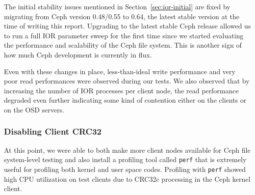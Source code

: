 The initial stability issues mentioned in Section~\ref{sec:ior-initial} are
fixed by migrating from Ceph version 0.48/0.55 to 0.64, the latest stable
version at the time of writing this report.  Upgrading to the latest stable
Ceph release allowed us to run a full IOR parameter sweep for the first time
since we started evaluating the performance and scalability of the Ceph file
system.  This is another sign of how much Ceph development is currently in
flux.


\begin{comment}

Another fix introduced by Ceph version 0.64 was in pool creation.  The default
data pool used by previous Ceph version were set to 2x replication by mistake.
This potentially halved the write performance. With version 0.64 we explicitly
set the replication level to 1, which is the preferred value for a HPC
environment like ours running on high-end and reliable storage backend hardware
(e.g. DDN SFA10K).

\end{comment}


Even with these changes in place, less-than-ideal write performance and very
poor read performances were observed during our tests.  We also observed that
by increasing the number of IOR processes per client node, the read
performance degraded even further indicating some kind of contention either on
the clients or on the OSD servers.


\subsubsection{Disabling Client CRC32}

At this point, we were able to both make more client nodes available for Ceph
file system-level testing and also install a profiling tool called \verb!perf!
that is extremely useful for profiling both kernel and user space codes.
Profiling with \verb!perf! showed high CPU utilization on test clients due to
CRC32c processing in the Ceph kernel client.  





